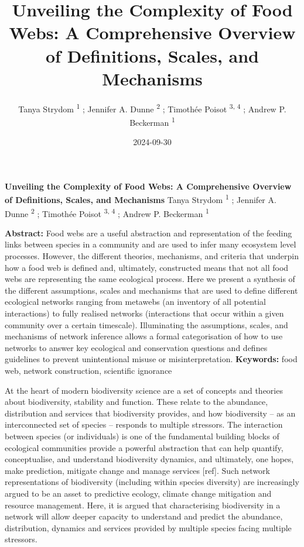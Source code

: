 \documentclass[
]{article}
\title{Unveiling the Complexity of Food Webs: A Comprehensive Overview
of Definitions, Scales, and Mechanisms}
\author{Tanya Strydom %
%
\textsuperscript{%
%
1%
}%
; Jennifer A. Dunne %
%
\textsuperscript{%
%
2%
}%
; Timothée Poisot %
%
\textsuperscript{%
3,%
4%
}%
; Andrew P. Beckerman %
%
\textsuperscript{%
%
1%
}%
}
\date{2024-09-30}
\begin{document}
\thispagestyle{empty}
{\bfseries\sffamily\Large Unveiling the Complexity of Food Webs: A
Comprehensive Overview of Definitions, Scales, and Mechanisms}
\vfil
Tanya Strydom %
%
\textsuperscript{%
%
1%
}%
; Jennifer A. Dunne %
%
\textsuperscript{%
%
2%
}%
; Timothée Poisot %
%
\textsuperscript{%
3,%
4%
}%
; Andrew P. Beckerman %
%
\textsuperscript{%
%
1%
}%

\vfil
{\small
\textbf{Abstract:} Food webs are a useful abstraction and representation
of the feeding links between species in a community and are used to
infer many ecosystem level processes. However, the different theories,
mechanisms, and criteria that underpin how a food web is defined and,
ultimately, constructed means that not all food webs are representing
the same ecological process. Here we present a synthesis of the
different assumptions, scales and mechanisms that are used to define
different ecological networks ranging from metawebs (an inventory of all
potential interactions) to fully realised networks (interactions that
occur within a given community over a certain timescale). Illuminating
the assumptions, scales, and mechanisms of network inference allows a
formal categorisation of how to use networks to answer key ecological
and conservation questions and defines guidelines to prevent
unintentional misuse or misinterpretation.
\vfil
\textbf{Keywords:} %
food web, network construction, %
scientific ignorance%
}
\clearpage
\setcounter{page}{1}
\doublespacing
\linenumbers


At the heart of modern biodiversity science are a set of concepts and
theories about biodiversity, stability and function. These relate to the
abundance, distribution and services that biodiversity provides, and how
biodiversity -- as an interconnected set of species -- responds to
multiple stressors. The interaction between species (or individuals) is
one of the fundamental building blocks of ecological communities provide
a powerful abstraction that can help quantify, conceptualise, and
understand biodiversity dynamics, and ultimately, one hopes, make
prediction, mitigate change and manage services {[}ref{]}. Such network
representations of biodiversity (including within species diversity) are
increasingly argued to be an asset to predictive ecology, climate change
mitigation and resource management. Here, it is argued that
characterising biodiversity in a network will allow deeper capacity to
understand and predict the abundance, distribution, dynamics and
services provided by multiple species facing multiple stressors.
\end{document}

